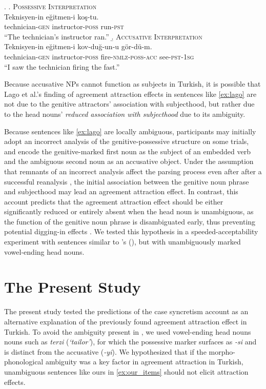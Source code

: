 \documentclass[]{interact}
\theoremstyle{plain}%
\theoremstyle{definition}
\theoremstyle{remark}
\begin{document}
\ex.
\label{ex:ambiguous}
  \a. \textsc{Possessive Interpretation} \label{ex:ambiguous_possessive} \\
  \gll Teknisyen-in e\u{g}itmen-i ko\c{s}-tu.\\
       technician-\textsc{gen} instructor-\textsc{poss} run-\textsc{pst}\\
  \glt ``The technician's instructor ran.''
  \b. \textsc{Accusative Interpretation} \label{ex:ambiguous_accusative}\\
  \gll Teknisyen-in e\u{g}itmen-i kov-du\u{g}-un-u g\"{o}r-d\"{u}-m.\\
  technician-\textsc{gen} instructor-\textsc{poss} fire-\textsc{nmlz}-\textsc{poss}-\textsc{acc} see-\textsc{pst}-\textsc{1sg}\\
  \glt ``I saw the technician firing the fast.''

Because accusative NPs cannot function as subjects in Turkish, it is possible that Lago et al.'s finding of agreement attraction effects in sentences like \ref{ex:lago} are not due to the genitive attractors' association with subjecthood, but rather due to the head nouns' \textit{reduced association with subjecthood} due to its ambiguity.

Because sentences like \ref{ex:lago} are locally ambiguous, participants may initially adopt an incorrect analysis of the genitive-possessive structure on some trials, and encode the genitive-marked first noun as the subject of an embedded verb and the ambiguous second noun as an accusative object. 
Under the assumption that remnants of an incorrect analysis affect the parsing process even after after a successful reanalysis \citep{Staub:2007}, the initial association between the genitive noun phrase and subjecthood may lead an agreement attraction effect. 
In contrast, this account predicts that the agreement attraction effect should be either significantly reduced or entirely absent when the head noun is unambiguous, as the function of the genitive noun phrase is disambiguated early, thus preventing potential digging-in effects \citep{Tabor:2004}. We tested this hypothesis in a speeded-acceptability experiment with sentences similar to \citeauthor{LagoEtAl:2019}'s (\citeyear{LagoEtAl:2019}), but with unambiguously marked vowel-ending head nouns. 

\section{The Present Study}

The present study tested the predictions of the case syncretism account as an alternative explanation of the previously found agreement attraction effect in Turkish. To avoid the ambiguity present in \citet{LagoEtAl:2019}, we used vowel-ending head nouns nouns such as \textit{terzi} (\textit{`tailor'}), for which the possessive marker surfaces as \textit{-si} and is distinct from the accusative (\textit{-yi}). We hypothesized that if the morpho-phonological ambiguity was a key factor in agreement attraction in Turkish, unambiguous sentences like ours in \ref{ex:our_items} should not elicit attraction effects.
\end{document}
